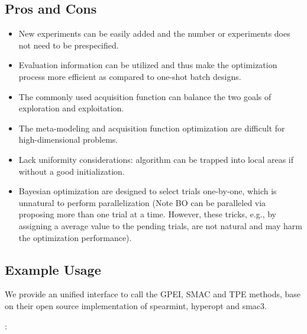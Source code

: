 \documentclass[letterpaper,10pt,english]{sphinxmanual}
\begin{document}
\subsection{Pros and Cons}
\label{\detokenize{pybayopt:pros-and-cons}}
\begin{itemize}
\item {} 
New experiments can be easily added and the number or experiments does not need to be prespecified.

\item {} 
Evaluation information can be utilized and thus make the optimization process more efficient as compared to one-shot batch designs.

\item {} 
The commonly used acquisition function can balance the two goals of exploration and exploitation.

\end{itemize}

\begin{itemize}
\item {} 
The meta-modeling and acquisition function optimization are difficult for high-dimensional problems.

\item {} 
Lack uniformity considerations: algorithm can be trapped into local areas if without a good initialization.

\item {} 
Bayesian optimization are designed to select trials one-by-one, which is unnatural to perform parallelization (Note BO can be paralleled via proposing more than one trial at a time. However, these tricks, e.g., by assigning a average value to the pending trials, are not natural and may harm the optimization performance).

\end{itemize}


\subsection{Example Usage}
\label{\detokenize{pybayopt:example-usage}}
We provide an unified interface to call the GPEI, SMAC and TPE methods, base on their open source implementation of spearmint, hyperopt and smac3.

:
\end{document}
